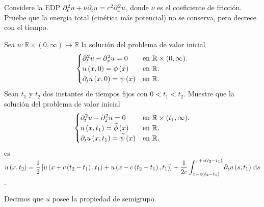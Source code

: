 \question

Considere la EDP
$\difcp[2]{u}{t}+\nu\difcp{u}{t}=c^{2}\difcp[2]{u}{x}$,
donde $\nu$ es el coeficiente de fricción.
Pruebe que la energía total (cinética más potencial) no se conserva,
pero decrece con el tiempo.

\question

Sea $u\colon\mathbb{R}\times(0,\infty)\to\mathbb{R}$
la solución del problema de valor inicial
\begin{equation*}
	\begin{cases}
		\difcp[2]{u}{t}-
		\difcp[2]{u}{x}=0  &
		\text{en }\mathbb{R}\times(0,\infty). \\
		u\left(x,0\right)=
		\phi\left(x\right) &
		\text{en }\mathbb{R}.                 \\
		\difcp{u}{t}\left(x,0\right)=
		\psi\left(x\right) &
		\text{en }\mathbb{R}.
	\end{cases}
\end{equation*}
Sean $t_{1}$ y $t_{2}$ dos instantes de tiempos fijos
con $0<t_{1}<t_{2}$.
Muestre que la solución del problema de valor inicial
\begin{equation*}
	\begin{cases}
		\difcp[2]{u}{t}-
		\difcp[2]{u}{x}=0 &
		\text{en }\mathbb{R}\times(t_{1},\infty). \\
		u\left(x,t_{1}\right)=
		\widetilde{\phi}
		\left(x\right)    &
		\text{en }\mathbb{R}.                     \\
		\difcp{u}{t}\left(x,t_{1}\right)=
		\widetilde{\psi}
		\left(x\right)    &
		\text{en }\mathbb{R}.
	\end{cases}
\end{equation*}
es
\begin{math}\displaystyle
	u\left(x,t_{2}\right)=
	\frac{1}{2}
	\left[
		u\left(x+c\left(t_{2}-t_{1}\right),t_{1}\right)+
		u\left(x-c\left(t_{2}-t_{1}\right),t_{1}\right)
		\right]+
	\frac{1}{2c}
	\int_{x-c\left(t_{2}-t_{1}\right)}^{x+c\left(t_{2}-t_{1}\right)}
	\difcp{u}{t}\left(s,t_{1}\right)\dl s
\end{math}.

Decimos que $u$ posee la propiedad de semigrupo.

\question

